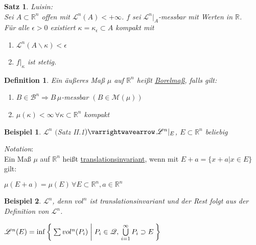 \documentclass[11pt]{memoir}
\theoremstyle{changebreak}
\newtheorem{Definition}{Definition}[chapter]
\newtheorem{Beispiel}{Beispiel}[chapter]
\newtheorem{Satz}{Satz}[chapter]
\begin{document}
\begin{Satz}
\emph{Luisin}: \\
Sei $A \subset \mathbb R^n$ offen mit $\mathscr L^n(A) < + \infty$. $f$ sei $\mathscr L^n|_A$-messbar mit Werten in $\mathbb R$. \\
Für alle $\epsilon > 0$ existiert $\kappa = \kappa_\epsilon \subset A$ kompakt mit
\begin{enumerate}
	\item $\mathscr L^n(A \backslash \kappa) < \epsilon$
	\item $f|_\kappa$ ist stetig.
\end{enumerate}
\end{Satz}



\begin{Definition}
Ein äußeres Maß $\mu$ auf $\mathbb R^n$ heißt \underline{Borelmaß}, falls gilt:
\begin{enumerate}
	\item $B \in \mathscr B^n \Rightarrow B \, \mu$-messbar $(B \in \mathscr M(\mu))$
	\item $\mu(\kappa) < \infty \, \forall \kappa \subset \mathbb R^n$ kompakt
\end{enumerate}
\end{Definition}

\begin{Beispiel}
$\mathscr L^n$ $($Satz II.1$) \varrightwavearrow \, \mathscr L^n|_E$, $E \subset \mathbb R^n$ beliebig
\end{Beispiel}

\emph{Notation}: \\
Ein Maß $\mu$ auf $\mathbb R^n$ heißt \underline{translationsinvariant}, wenn mit $E + a = \{x +a | x \in E\}$ gilt:
\begin{center}
	$\mu(E+a) = \mu(E) \, \forall E \subset \mathbb R^n, a \in \mathbb R^n$
\end{center}

\begin{Beispiel}
$\mathscr L^n$, denn $vol^n$ ist translationsinvariant und der Rest folgt aus der Definition von $\mathscr L^n$. \\
\begin{center}
	$\mathscr L^n(E) = \inf\Set{ \sum vol^n(P_i) | P_i \in \mathscr Q, \,\bigcup\limits_{i=1}^\infty P_i \supset E }$
\end{center}
\end{Beispiel}
\end{document}
